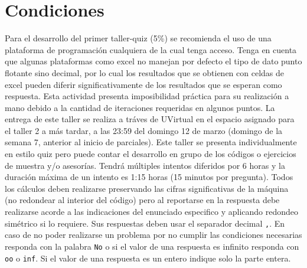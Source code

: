 \documentclass[12pt]{article}
\begin{document}
  \section{Condiciones}
  Para el desarrollo del primer taller-quiz (5\%) se recomienda el uso de una plataforma de programación cualquiera de la cual tenga acceso. Tenga en cuenta que algunas plataformas como excel no manejan por defecto el tipo de dato punto flotante sino decimal, por lo cual los resultados que se obtienen con celdas de excel pueden diferir significativamente de los resultados que se esperan como respuesta. Esta actividad presenta imposibilidad práctica para su realización a mano debido a la cantidad de iteraciones requeridas en algunos puntos.
La entrega de este taller se realiza a tráves de UVirtual en el espacio asignado para el taller 2 a más tardar, a las 23:59 del domingo 12 de marzo (domingo de la semana 7, anterior al inicio de parciales). Este taller se presenta individualmente en estilo quiz pero puede contar el desarrollo en grupo de los códigos o ejercicios de muestra y/o asesorías.
  Tendrá múltiples intentos diferidos por 6 horas y la duración máxima de un intento es 1:15 horas (15 minutos por pregunta).
  Todos los cálculos deben realizarse preservando las cifras significativas de la máquina (no redondear al interior del código) pero al reportarse en la respuesta debe realizarse acorde a las indicaciones del enunciado especifico y aplicando redondeo simétrico si lo requiere. Sus respuestas deben usar el separador decimal \verb-,-. En caso de no poder realizarse un problema por no cumplir las condiciones necesarias responda con la palabra \verb-No- o si el valor de una respuesta es infinito responda con \verb-oo- o \verb-inf-. Si el valor de una respuesta es un entero indique solo la parte entera.
\end{document}
